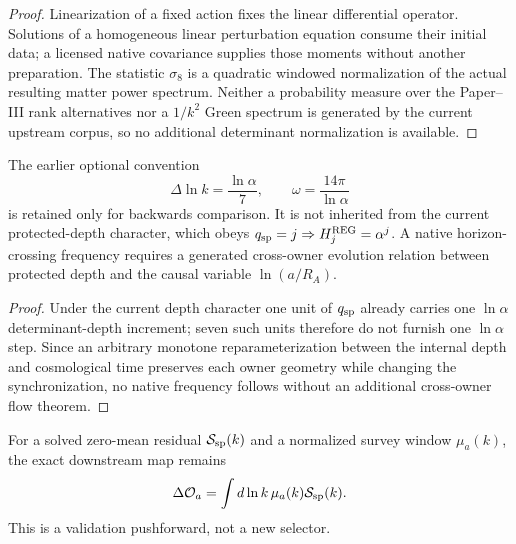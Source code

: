 \documentclass[12pt,a4paper]{article}
\begin{document}
\begin{proof}
Linearization of a fixed action fixes the linear differential operator.
Solutions of a homogeneous linear perturbation equation consume their initial
data; a licensed native covariance supplies those moments without another
preparation.  The statistic \(\sigma_8\) is a quadratic windowed normalization
of the actual resulting matter power spectrum.  Neither a probability measure over the
Paper--III rank alternatives nor a \(1/k^2\) Green spectrum is generated by
the current upstream corpus, so no additional determinant normalization is
available.
\end{proof}

\begin{proposition}
\label{p9:prop:conditional-protected-log-frequency}
The earlier optional convention
\begin{equation}
\label{p9:eq:conditional-log-frequency}
\Delta\ln k=\frac{\ln\alpha}{7},
\qquad
\omega=\frac{14\pi}{\ln\alpha}
\end{equation}
is retained only for backwards comparison.  It is not inherited from the
current protected-depth character, which obeys \(q_{\rm sp}=j\Rightarrow
H_j^{\rm REG}=\alpha^j\).  A native horizon-crossing frequency requires a
generated cross-owner evolution relation between protected depth and the
causal variable \(\ln(a/R_A)\).
\end{proposition}

\begin{proof}
Under the current depth character one unit of \(q_{\rm sp}\) already carries
one \(\ln\alpha\) determinant-depth increment; seven such units therefore do
not furnish one \(\ln\alpha\) step.  Since an arbitrary monotone
reparameterization between the internal depth and cosmological time preserves
each owner geometry while changing the synchronization, no native frequency
follows without an additional cross-owner flow theorem.
\end{proof}

For a solved zero-mean residual \(\mathcal S_{\rm sp}(k)\) and a normalized
survey window \(\mu_a(k)\), the exact downstream map remains
\begin{equation}
\label{p9:eq:smooth-transfer-window-map}
\Delta\mathcal O_a=\int d\ln k\,\mu_a(k)\mathcal S_{\rm sp}(k).
\end{equation}
This is a validation pushforward, not a new selector.

\end{document}
